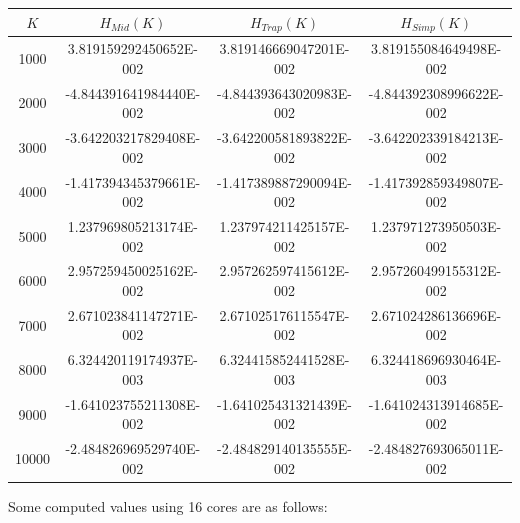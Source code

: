 \documentclass{article}
\theoremstyle{remark}
\theoremstyle{remark}
\newcommand{\p}{\phantom{-}}
\begin{document}
	\begin{table}[H]
		\begin{tabular}{cccc}
			\toprule[0.5mm]
			 $K$  &        $H_{Mid}(K)$       &       $H_{Trap}(K)$       &       $H_{Simp}(K)$       \\
			\midrule
			 1000 & \p 3.819159292450652E-002 & \p 3.819146669047201E-002 & \p 3.819155084649498E-002 \\
			 2000 &   -4.844391641984440E-002 &   -4.844393643020983E-002 &   -4.844392308996622E-002 \\
			 3000 &   -3.642203217829408E-002 &   -3.642200581893822E-002 &   -3.642202339184213E-002 \\
			 4000 &   -1.417394345379661E-002 &   -1.417389887290094E-002 &   -1.417392859349807E-002 \\
			 5000 & \p 1.237969805213174E-002 & \p 1.237974211425157E-002 & \p 1.237971273950503E-002 \\
			 6000 & \p 2.957259450025162E-002 & \p 2.957262597415612E-002 & \p 2.957260499155312E-002 \\
			 7000 & \p 2.671023841147271E-002 & \p 2.671025176115547E-002 & \p 2.671024286136696E-002 \\
			 8000 & \p 6.324420119174937E-003 & \p 6.324415852441528E-003 & \p 6.324418696930464E-003 \\
			 9000 &   -1.641023755211308E-002 &   -1.641025431321439E-002 &   -1.641024313914685E-002 \\
			10000 &   -2.484826969529740E-002 &   -2.484829140135555E-002 &   -2.484827693065011E-002 \\		  
			\bottomrule[0.5mm]
		\end{tabular}
	\end{table}
	Some computed values using 16 cores are as follows: \par
\end{document}
